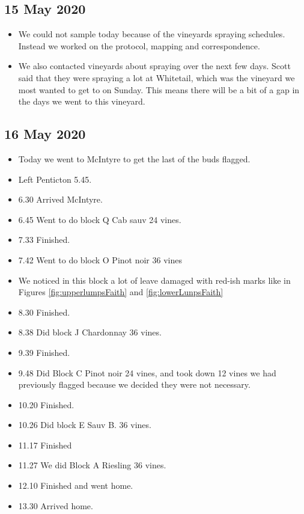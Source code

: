 \documentclass[11pt,letter]{article}
\newenvironment{smitemize}{
\begin{itemize}
  \setlength{\itemsep}{0pt}
  \setlength{\parskip}{0.8pt}
  \setlength{\parsep}{0pt}}
{\end{itemize}
}
\begin{document}
\subsection {15 May 2020}
\begin{smitemize}
\item We could not sample today because of the vineyards spraying schedules. Instead we worked on the protocol, mapping and correspondence.
\item We also contacted vineyards about spraying over the next few days. Scott said that they were spraying a lot at Whitetail, which was the vineyard we most wanted to get to on Sunday. This means there will be a bit of a gap in the days we went to this vineyard. 
\end{smitemize}

\subsection {16 May 2020}
\begin{smitemize}
\item Today we went to McIntyre to get the last of the buds flagged. 
\item Left Penticton 5.45.
\item 6.30 Arrived McIntyre.
\item 6.45 Went to do block Q Cab sauv 24 vines.
\item 7.33 Finished. 
\item 7.42 Went to do block O Pinot noir 36 vines
\item We noticed in this block a lot of leave damaged with red-ish marks like in Figures \ref{fig:upperlumpsFaith} and \ref{fig:lowerLunpsFaith}
\item 8.30 Finished.
\item 8.38 Did block J Chardonnay 36 vines. 
\item 9.39 Finished.
\item 9.48 Did Block C Pinot noir 24 vines, and took down 12 vines we had previously flagged because we decided they were not necessary.
\item 10.20 Finished.
\item 10.26 Did block E Sauv B. 36 vines.
\item 11.17 Finished
\item 11.27 We did Block A Riesling 36 vines. 
\item 12.10 Finished and went home.
\item 13.30 Arrived home. 
\end{smitemize}
\end{document}
